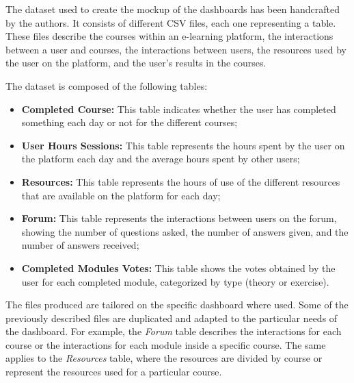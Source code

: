 The dataset used to create the mockup of the dashboards has been handcrafted by the authors.
It consists of different CSV files, each one representing a table. These files describe
the courses within an e-learning platform, the interactions between a user and courses,
the interactions between users, the resources used by the user on the platform, and the user's
results in the courses.

The dataset is composed of the following tables:
\begin{itemize}
    \item 
        \textbf{Completed Course:} This table indicates whether the user has completed something each 
        day or not for the different courses;
    \item 
        \textbf{User Hours Sessions:} This table represents the hours spent by the user on the platform 
        each day and the average hours spent by other users;
    \item 
        \textbf{Resources:} This table represents the hours of use of the different resources that are
        available on the platform for each day;
    \item 
        \textbf{Forum:} This table represents the interactions between users on the forum, showing the number
        of questions asked, the number of answers given, and the number of answers received;
    \item 
        \textbf{Completed Modules Votes:} This table shows the votes obtained by the user for each completed module, 
        categorized by type (theory or exercise).
\end{itemize}

The files produced are tailored on the specific dashboard where used. Some of the previously described files
are duplicated and adapted to the particular needs of the dashboard. For example, the \textit{Forum} table describes
the interactions for each course or the interactions for each module inside a specific course. The same applies to the
\textit{Resources} table, where the resources are divided by course or represent the resources used for a particular course.
